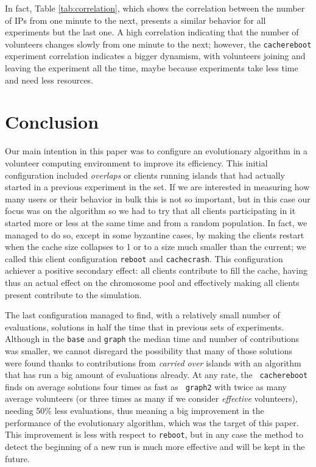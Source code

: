\documentclass[runningheads,a4paper]{llncs}\usepackage[]{graphicx}\usepackage[]{color}
\begin{document}
In fact, Table \ref{tab:correlation}, which shows
the correlation between the number of IPs from one minute to the
next, presents a similar  behavior for all experiments but the last one. A high correlation indicating that the number of volunteers changes
slowly from one minute to the next; however, the {\tt cachereboot} experiment correlation indicates a bigger
dynamism, with volunteers joining and leaving the experiment all the
time, maybe because experiments take less time and need less resources. 

\section{Conclusion}
\label{sec:conclusion}

Our main intention in this paper was to configure an evolutionary
algorithm in a volunteer computing environment to improve its
efficiency. This initial configuration included
{\em overlaps} or clients running islands that had actually started in
a previous experiment in the set. If we are interested in measuring
how many users or their behavior in bulk this is not so important, but
in this case our focus was on the algorithm so we had to try that all
clients participating in it started more or less at the same time and
from a random population. In fact, we managed to do so, except in some
byzantine cases, by making the clients restart when the cache size
collapses to 1 or to a size much smaller than the current; we called
this client configuration {\tt reboot} and {\tt cachecrash}.  This
configuration achiever a positive secondary effect: all clients
contribute to fill the cache, having thus an actual effect on the
chromosome pool and effectively making all clients present contribute
to the simulation. 

The last configuration managed to find, with a relatively small number
of evaluations, solutions in half the time that in previous sets of
experiments. Although in the {\tt base} and {\tt graph} the median
time and number of contributions was smaller, we cannot disregard the
possibility that many of those solutions were found thanks to
contributions from {\em carried over} islands with an algorithm that
has run a big amount of evaluations already. At any rate, the {\tt
  cachereboot} finds on average solutions four times as fast as {\tt
  graph2} with twice as many average volunteers (or three times as
many if we consider {\em effective} volunteers), needing 50\% less
evaluations, thus meaning a big improvement in the performance of the
evolutionary algorithm, which was the target of this paper. This
improvement is less with respect to {\tt reboot}, but in any case the
method to detect the beginning of a new run is much more effective and
will be kept in the future.
\end{document}
